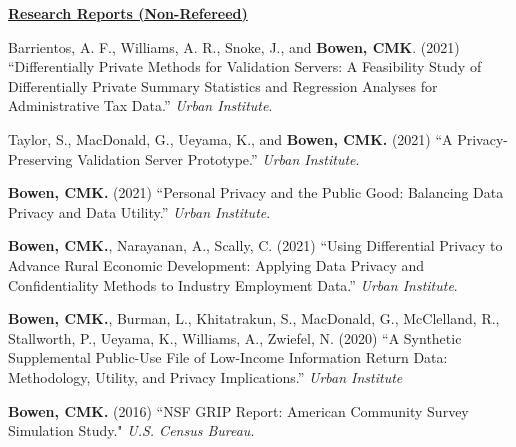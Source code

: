 \documentclass[11pt, letterpaper, roman]{moderncv} %
\begin{document}
\vspace{6pt}
\noindent\underline{\textbf{Research Reports (Non-Refereed)}}
\vspace{4pt}
\begin{etaremune}[topsep=0pt, itemsep=6pt, partopsep=0pt, parsep=0pt]
    \item Barrientos, A. F., Williams, A. R., Snoke, J., and \textbf{Bowen, CMK}. (2021) ``Differentially Private Methods for Validation Servers: A Feasibility Study of Differentially Private Summary Statistics and Regression Analyses for Administrative Tax Data.'' \textit{Urban Institute}.
    
    \item Taylor, S., MacDonald, G., Ueyama, K., and \textbf{Bowen, CMK.} (2021) ``A Privacy-Preserving Validation Server Prototype.'' \textit{Urban Institute}.
        
    \item \textbf{Bowen, CMK.} (2021) ``Personal Privacy and the Public Good: Balancing Data Privacy and Data Utility.'' \textit{Urban Institute}.
    
    \item \textbf{Bowen, CMK.}, Narayanan, A., Scally, C. (2021) ``Using Differential Privacy to Advance Rural Economic Development: Applying Data Privacy and Confidentiality Methods to Industry Employment Data.'' \textit{Urban Institute}.
    
    \item \textbf{Bowen, CMK.}, Burman, L., Khitatrakun, S., MacDonald, G., McClelland, R., Stallworth, P., Ueyama, K., Williams, A., Zwiefel, N. (2020) ``A Synthetic Supplemental Public-Use File of Low-Income Information Return Data: Methodology, Utility, and Privacy Implications.'' \textit{Urban Institute}
    
    \item \textbf{Bowen, CMK.} (2016) ``NSF GRIP Report: American Community Survey Simulation Study." \textit{U.S. Census Bureau}.  
\end{etaremune}
\end{document}
